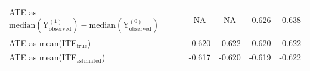 \begin{table}[htbp]
\begin{tabular}{l c c c c}
ATE as $\text{median}(\text{Y}_\text{observed}^{(1)}) - \text{median}(\text{Y}_\text{observed}^{(0)})$  
& NA & NA 
& -0.626 
& -0.638 \\

ATE as mean(ITE$_\text{true}$)  
& -0.620 
& -0.622 
& -0.620 
& -0.622 \\

ATE as mean(ITE$_\text{estimated}$) 
& -0.617 
& -0.620 
& -0.619 
& -0.622 \\
\bottomrule
\end{tabular}
\end{table}

% 




